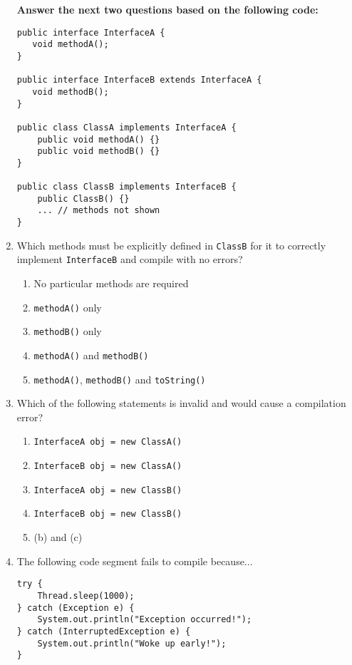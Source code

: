 \documentclass[CS180-S16-FinalExam.tex]{subfiles}
\begin{document}
\begin{enumerate}

\clearpage
\textbf{Answer the next two questions based on the following code:}
\begin{lstlisting}
public interface InterfaceA {
   void methodA();
}

public interface InterfaceB extends InterfaceA {
   void methodB();
}
   
public class ClassA implements InterfaceA {
	public void methodA() {}
	public void methodB() {}
}

public class ClassB implements InterfaceB {
	public ClassB() {}
	... // methods not shown
}
\end{lstlisting}
\item Which methods must be explicitly defined in \texttt{ClassB} for it to correctly implement \texttt{InterfaceB} and compile with no errors?
\begin{enumerate}
\item No particular methods are required  
\item \texttt{methodA()} only
\item \texttt{methodB()} only 
\item \texttt{methodA()} and \texttt{methodB()} \ifdraft \Ans \fi
\item \texttt{methodA()}, \texttt{methodB()} and \texttt{toString()}
\end{enumerate}

\item  Which of the following statements is invalid and would cause a compilation error?
\begin{enumerate}
\item \texttt{InterfaceA obj = new ClassA()}
\item \texttt{InterfaceB obj = new ClassA()} \ifdraft \Ans \fi
\item \texttt{InterfaceA obj = new ClassB()}
\item \texttt{InterfaceB obj = new ClassB()}
\item (b) and (c)
\end{enumerate}

\clearpage
\item The following code segment fails to compile because...
\begin{lstlisting}
try {
	Thread.sleep(1000);
} catch (Exception e) {
    System.out.println("Exception occurred!");
} catch (InterruptedException e) {
    System.out.println("Woke up early!");
}


\end{lstlisting}
\end{enumerate}
\end{document}
